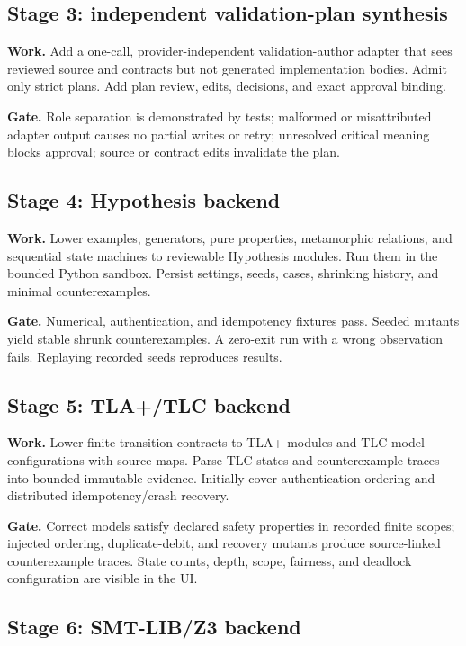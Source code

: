 \documentclass[10pt]{article}
\begin{document}
\subsection*{Stage 3: independent validation-plan synthesis}

\textbf{Work.} Add a one-call, provider-independent validation-author adapter
that sees reviewed source and contracts but not generated implementation
bodies.  Admit only strict plans.  Add plan review, edits, decisions, and exact
approval binding.

\textbf{Gate.} Role separation is demonstrated by tests; malformed or
misattributed adapter output causes no partial writes or retry; unresolved
critical meaning blocks approval; source or contract edits invalidate the plan.

\subsection*{Stage 4: Hypothesis backend}

\textbf{Work.} Lower examples, generators, pure properties, metamorphic
relations, and sequential state machines to reviewable Hypothesis modules.
Run them in the bounded Python sandbox.  Persist settings, seeds, cases,
shrinking history, and minimal counterexamples.

\textbf{Gate.} Numerical, authentication, and idempotency fixtures pass.
Seeded mutants yield stable shrunk counterexamples.  A zero-exit run with a
wrong observation fails.  Replaying recorded seeds reproduces results.

\subsection*{Stage 5: TLA+/TLC backend}

\textbf{Work.} Lower finite transition contracts to TLA+ modules and TLC model
configurations with source maps.  Parse TLC states and counterexample traces
into bounded immutable evidence.  Initially cover authentication ordering and
distributed idempotency/crash recovery.

\textbf{Gate.} Correct models satisfy declared safety properties in recorded
finite scopes; injected ordering, duplicate-debit, and recovery mutants produce
source-linked counterexample traces.  State counts, depth, scope, fairness, and
deadlock configuration are visible in the UI.

\subsection*{Stage 6: SMT-LIB/Z3 backend}
\end{document}
